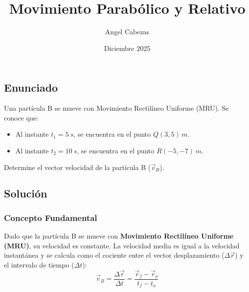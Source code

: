 \documentclass[12pt, a4paper]{article}
\title{Movimiento Parabólico y Relativo}
\author{Angel Cabezas}
\date{Diciembre 2025}
\begin{document}
\maketitle

\subsection*{Enunciado}
Una partícula B se mueve con Movimiento Rectilíneo Uniforme (MRU). Se conoce que:
\begin{itemize}
    \item Al instante $t_1 = \SI{5}{s}$, se encuentra en el punto $Q(3, 5)\,\si{m}$.
    \item Al instante $t_2 = \SI{10}{s}$, se encuentra en el punto $R(-5, -7)\,\si{m}$.
\end{itemize}
Determine el vector velocidad de la partícula B ($\vec{v}_B$).

\begin{center}
\end{center}

\subsection*{Solución}

\subsubsection*{Concepto Fundamental}
Dado que la partícula B se mueve con \textbf{Movimiento Rectilíneo Uniforme (MRU)}, su velocidad es constante. La velocidad media es igual a la velocidad instantánea y se calcula como el cociente entre el vector desplazamiento ($\Delta \vec{r}$) y el intervalo de tiempo ($\Delta t$):
\begin{equation}
    \vec{v}_B = \frac{\Delta \vec{r}}{\Delta t} = \frac{\vec{r}_f - \vec{r}_o}{t_f - t_o}
\end{equation}
\end{document}
